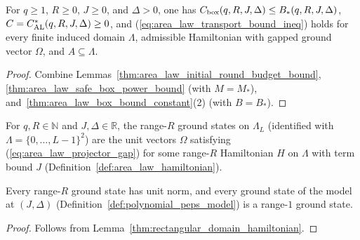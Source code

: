 \begin{lemma}
    \label{thm:area_law_elementary_constant}
    \leanok
    For $q\ge1$, $R\ge0$, $J\ge0$, and $\Delta>0$, one has
    $C_{\rm box}(q,R,J,\Delta)\le B_*(q,R,J,\Delta)$, $C=C_{\rm AL}^*(q,R,J,\Delta)\ge0$, and (\ref{eq:area_law_transport_bound_ineq}) holds for every finite induced domain $\Lambda$, admissible Hamiltonian with gapped ground vector $\Omega$, and $A\subseteq\Lambda$.
\end{lemma}
\begin{proof}
    \leanok
    Combine Lemmas~\ref{thm:area_law_initial_round_budget_bound}, \ref{thm:area_law_safe_box_power_bound} (with $M=M_*$), and~\ref{thm:area_law_box_bound_constant}(2) (with $B=B_*$).
\end{proof}

\begin{definition}
    \label{def:square_range_ground_states}
    \leanok
    For $q,R\in\mathbb N$ and $J,\Delta\in\mathbb R$, the range-$R$ ground states on $\Lambda_L$ (identified with $\Lambda=\{0,\ldots,L-1\}^2$) are the unit vectors $\Omega$ satisfying (\ref{eq:area_law_projector_gap}) for some range-$R$ Hamiltonian $H$ on $\Lambda$ with term bound $J$ (Definition~\ref{def:area_law_hamiltonian}).
\end{definition}

\begin{lemma}
    \label{thm:square_ground_states_range_one}
    \leanok
    Every range-$R$ ground state has unit norm, and every ground state of the model at $(J,\Delta)$ (Definition~\ref{def:polynomial_peps_model}) is a range-$1$ ground state.
\end{lemma}
\begin{proof}
    \leanok
    Follows from Lemma~\ref{thm:rectangular_domain_hamiltonian}.
\end{proof}

